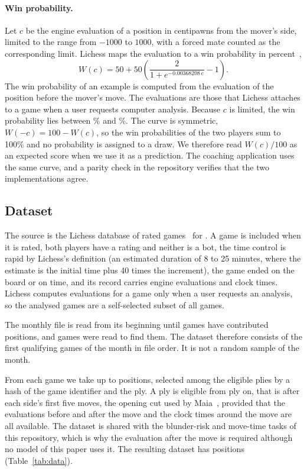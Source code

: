\documentclass[11pt]{article}
\begin{document}
\paragraph{Win probability.}
Let $c$ be the engine evaluation of a position in centipawns from the mover's
side, limited to the range from $-1000$ to $1000$, with a forced mate counted
as the corresponding limit. Lichess maps the evaluation to a win probability
in percent~\cite{lichessaccuracy},
\[
W(c) = 50 + 50\left(\frac{2}{1 + e^{-0.00368208\,c}} - 1\right).
\]
The win probability of an example is computed from the evaluation of the
position before the mover's move. The evaluations are those that Lichess
attaches to a game when a user requests computer analysis.\iflook{} Because
$c$ is limited, the win probability lies between
\% and \%.\fi{} The
curve is symmetric, $W(-c) = 100 - W(c)$, so the win probabilities of the two
players sum to 100\% and no probability is assigned to a draw. We therefore
read $W(c)/100$ as an expected score when we use it as a prediction. The
coaching application uses the same curve, and a parity check in the
repository verifies that the two implementations agree.

\subsection{Dataset}

The source is the Lichess database of rated games~\cite{lichessdb} for
. A game is included when it is rated, both players have a
rating and neither is a bot, the time control is rapid by Lichess's
definition (an estimated duration of 8 to 25 minutes, where the estimate is
the initial time plus 40 times the increment), the game ended on the board
or on time, and its record carries engine evaluations and clock times.
Lichess computes evaluations for a game only when a user requests an
analysis, so the analysed games are a self-selected subset of all games.

The monthly file is read from its beginning until  games have
contributed positions, and  games were read to find
them. The dataset therefore consists of the first qualifying games of the
month in file order. It is not a random sample of the month.

From each game we take up to  positions, selected among
the eligible plies by a hash of the game identifier and the ply. A ply is
eligible from ply  on, that is after each side's first five
moves, the opening cut used by Maia~\cite{maia}, provided that the
evaluations before and after the move and the clock times around the move are
all available. The dataset is shared with the blunder-risk and move-time
tasks of this repository, which is why the evaluation after the move is
required although no model of this paper uses it. The resulting dataset has
 positions (Table~\ref{tab:data}).
\end{document}
